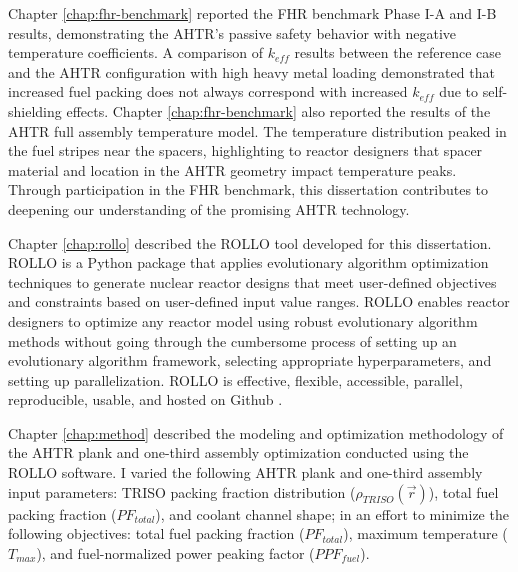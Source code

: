 Chapter \ref{chap:fhr-benchmark} reported the \gls{FHR} benchmark Phase I-A and I-B 
results, demonstrating the \gls{AHTR}'s passive safety behavior with 
negative temperature coefficients. 
A comparison of $k_{eff}$ results between the reference case and the \gls{AHTR} 
configuration with high heavy metal loading demonstrated that increased fuel 
packing does not always correspond with increased $k_{eff}$ due to self-shielding 
effects.
Chapter \ref{chap:fhr-benchmark} also reported the results of the \gls{AHTR} full 
assembly temperature model. 
The temperature distribution peaked in the fuel stripes near the spacers, 
highlighting to reactor designers that spacer material and location in the 
\gls{AHTR} geometry impact temperature peaks.  
Through participation in the \gls{FHR} benchmark, this dissertation contributes to 
deepening our understanding of the promising \gls{AHTR} technology. 

Chapter \ref{chap:rollo} described the \gls{ROLLO} tool developed for this 
dissertation. 
\gls{ROLLO} is a Python package that applies evolutionary algorithm 
optimization techniques to generate nuclear reactor designs that meet user-defined 
objectives and constraints based on user-defined input value ranges. 
\gls{ROLLO} enables reactor designers to optimize any reactor model using robust 
evolutionary algorithm methods without going through the cumbersome process of setting up 
an evolutionary algorithm framework, selecting appropriate hyperparameters, and 
setting up parallelization.
\gls{ROLLO} is effective, flexible, accessible, parallel, reproducible, usable, and 
hosted on Github \cite{chee_rollo_2021}. 

Chapter \ref{chap:method} described the modeling and optimization methodology of the 
\gls{AHTR} plank and one-third assembly optimization conducted using the \gls{ROLLO} 
software.
I varied the following \gls{AHTR} plank and one-third assembly input parameters: 
\gls{TRISO} packing fraction distribution ($\rho_{TRISO}(\vec{r})$), total fuel 
packing fraction ($PF_{total}$), and coolant channel shape; in an effort to minimize 
the following objectives: total fuel packing fraction ($PF_{total}$), maximum 
temperature ($T_{max}$), and fuel-normalized power peaking factor ($PPF_{fuel}$). 

